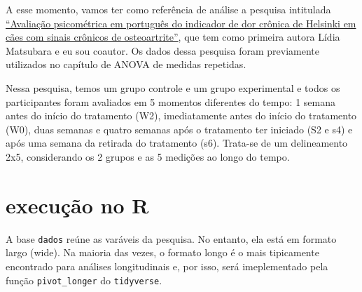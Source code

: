 \documentclass[
]{book}
\begin{document}
A esse momento, vamos ter como referência de análise a pesquisa intitulada \href{https://www.scielo.br/scielo.php?script=sci_arttext\&pid=S0102-09352019000100109}{``Avaliação psicométrica em português do indicador de dor crônica de Helsinki em cães com sinais crônicos de osteoartrite''}, que tem como primeira autora Lídia Matsubara e eu sou coautor. Os dados dessa pesquisa foram previamente utilizados no capítulo de ANOVA de medidas repetidas.

Nessa pesquisa, temos um grupo controle e um grupo experimental e todos os participantes foram avaliados em 5 momentos diferentes do tempo: 1 semana antes do início do tratamento (W2), imediatamente antes do início do tratamento (W0), duas semanas e quatro semanas após o tratamento ter iniciado (S2 e s4) e após uma semana da retirada do tratamento (s6). Trata-se de um delineamento 2x5, considerando os 2 grupos e as 5 medições ao longo do tempo.

\hypertarget{execuuxe7uxe3o-no-r-11}{%
\section{execução no R}\label{execuuxe7uxe3o-no-r-11}}

A base \texttt{dados} reúne as varáveis da pesquisa. No entanto, ela está em formato largo (wide). Na maioria das vezes, o formato longo é o mais tipicamente encontrado para análises longitudinais e, por isso, será imeplementado pela função \texttt{pivot\_longer} do \texttt{tidyverse}.
\end{document}
